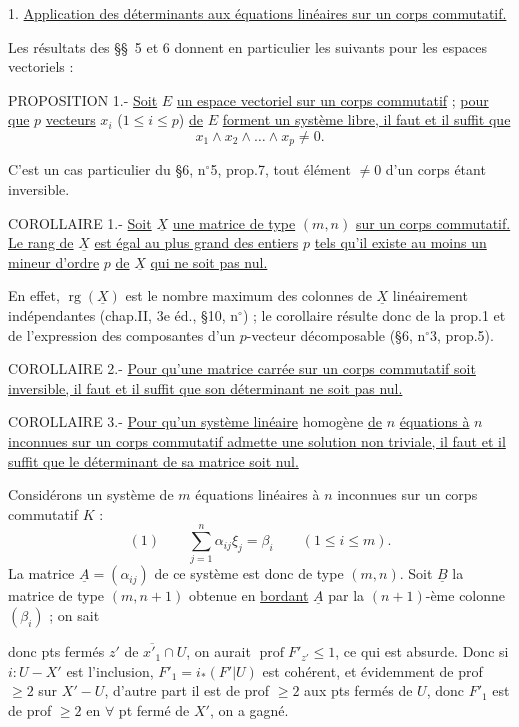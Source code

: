 1. \uline{Application des déterminants aux équations linéaires sur un corps commutatif.}

Les résultats des \S\S\ 5 et 6 donnent en particulier les suivants pour les
espaces vectoriels :

PROPOSITION 1.- \uline{Soit} $E$ \uline{un espace vectoriel sur un corps commutatif} ; \uline{pour que} $p$
\uline{vecteurs} $x_i$ ($1\leq i\leq p$) \uline{de} $E$ \uline{forment un système libre, il faut et il suffit que}
\[
x_1\wedge x_2\wedge\ldots\wedge x_p\ne0.
\]

C'est un cas particulier du \S6, n$^\circ$5, prop.7, tout élément $\ne0$ d'un corps étant
inversible.

COROLLAIRE 1.- \uline{Soit} $\underline X$ \uline{une matrice de type} $(m,n)$ \uline{sur un corps commutatif. Le rang
de} $\underline X$ \uline{est égal au plus grand des entiers} $p$ \uline{tels qu'il existe au moins un mineur
d'ordre} $p$ \uline{de} $\underline X$ \uline{qui ne soit pas nul.}

En effet, $\operatorname{rg}(\underline X)$ est le nombre maximum des colonnes de $\underline X$ linéairement indépendantes
(chap.II, 3e éd., \S10, n$^\circ$\quad ) ; le corollaire résulte donc de la prop.1 et de
l'expression des composantes d'un $p$-vecteur décomposable (\S6, n$^\circ$3, prop.5).

COROLLAIRE 2.- \uline{Pour qu'une matrice carrée sur un corps commutatif soit inversible,
il faut et il suffit que son déterminant ne soit pas nul.}

COROLLAIRE 3.- \uline{Pour qu'un système linéaire} homogène \uline{de} $n$ \uline{équations à} $n$ \uline{inconnues
sur un corps commutatif admette une solution non triviale, il faut et il suffit que
le déterminant de sa matrice soit nul.}

Considérons un système de $m$ équations linéaires à $n$ inconnues sur un corps commutatif $K$ :
\[
(1)\qquad\sum_{j=1}^n\alpha_{ij}\xi_j=\beta_i\qquad(1\leq i\leq m).
\]
La matrice $\underline A=(\alpha_{ij})$ de ce système est donc de type $(m,n)$. Soit $\underline B$ la matrice
de type $(m,n+1)$ obtenue en \uline{bordant} $\underline A$ par la $(n+1)$-ème colonne $(\beta_i)$ ; on sait


donc  pts fermés $z'$ de $\overline{x'_1}\cap U$, on
aurait $\operatorname{prof}F'_{z'}\leq1$, ce qui est absurde. Donc
si $i:U\mathbin{-}X'$ est l'inclusion, $F'_1=i_*(F'|U)$
est cohérent, et évidemment de prof $\ge2$
sur $X'-U$, d'autre part il est de prof $\ge2$
aux pts fermés de  $U$, donc
$F'_1$ est de prof $\ge2$ en \uline{$\forall$} pt fermé de $X'$,
on a gagné.

